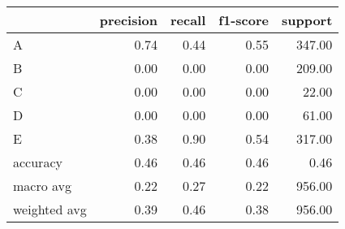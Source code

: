 \begin{tabular}{|l|r|r|r|r|}
\hline
{} &  precision &  recall &  f1-score &  support \\
\hline
A            &       0.74 &    0.44 &      0.55 &   347.00 \\
B            &       0.00 &    0.00 &      0.00 &   209.00 \\
C            &       0.00 &    0.00 &      0.00 &    22.00 \\
D            &       0.00 &    0.00 &      0.00 &    61.00 \\
E            &       0.38 &    0.90 &      0.54 &   317.00 \\
accuracy     &       0.46 &    0.46 &      0.46 &     0.46 \\
macro avg    &       0.22 &    0.27 &      0.22 &   956.00 \\
weighted avg &       0.39 &    0.46 &      0.38 &   956.00 \\
\hline
\end{tabular}
